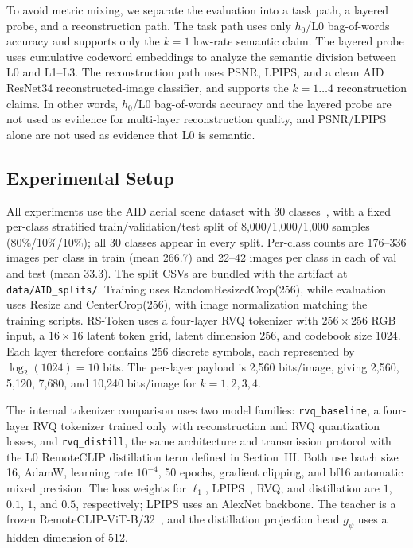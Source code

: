 \documentclass[lettersize,journal]{IEEEtran}
\begin{document}
To avoid metric mixing, we separate the evaluation into a task path, a layered probe, and a reconstruction path. The task path uses only $h_0$/L0 bag-of-words accuracy and supports only the $k=1$ low-rate semantic claim. The layered probe uses cumulative codeword embeddings to analyze the semantic division between L0 and L1--L3. The reconstruction path uses PSNR, LPIPS, and a clean AID ResNet34 reconstructed-image classifier, and supports the $k=1\ldots4$ reconstruction claims. In other words, $h_0$/L0 bag-of-words accuracy and the layered probe are not used as evidence for multi-layer reconstruction quality, and PSNR/LPIPS alone are not used as evidence that L0 is semantic.

\subsection{Experimental Setup}
All experiments use the AID aerial scene dataset with 30 classes~\cite{xia2017aid}, with a fixed per-class stratified train/validation/test split of 8{,}000/1{,}000/1{,}000 samples (80\%/10\%/10\%); all 30 classes appear in every split. Per-class counts are 176--336 images per class in train (mean 266.7) and 22--42 images per class in each of val and test (mean 33.3). The split CSVs are bundled with the artifact at \texttt{data/AID\_splits/}. Training uses RandomResizedCrop(256), while evaluation uses Resize and CenterCrop(256), with image normalization matching the training scripts. RS-Token uses a four-layer RVQ tokenizer with $256\times256$ RGB input, a $16\times16$ latent token grid, latent dimension 256, and codebook size 1024. Each layer therefore contains 256 discrete symbols, each represented by $\log_2(1024)=10$ bits. The per-layer payload is 2{,}560 bits/image, giving 2{,}560, 5{,}120, 7{,}680, and 10{,}240 bits/image for $k=1,2,3,4$.

The internal tokenizer comparison uses two model families: \texttt{rvq\_baseline}, a four-layer RVQ tokenizer trained only with reconstruction and RVQ quantization losses, and \texttt{rvq\_distill}, the same architecture and transmission protocol with the L0 RemoteCLIP distillation term defined in Section~III. Both use batch size 16, AdamW, learning rate $10^{-4}$, 50 epochs, gradient clipping, and bf16 automatic mixed precision. The loss weights for $\ell_1$, LPIPS~\cite{zhang2018lpips}, RVQ, and distillation are $1$, $0.1$, $1$, and $0.5$, respectively; LPIPS uses an AlexNet backbone. The teacher is a frozen RemoteCLIP-ViT-B/32~\cite{liu2024remoteclip}, and the distillation projection head $g_\psi$ uses a hidden dimension of 512.
\end{document}
